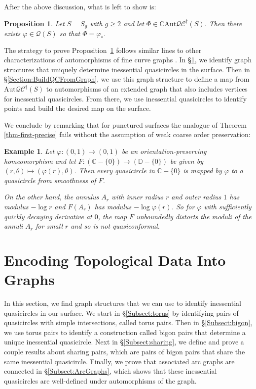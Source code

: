 \documentclass[12pt,a4paper]{amsart}
\newcommand{\bbC}{\mathbb C}
\newcommand{\bbD}{\mathbb D}
\theoremstyle{definition}
\theoremstyle{plain}
\newtheorem{proposition}[theorem]{Proposition}
\newtheorem{example}[theorem]{Example}
\numberwithin{equation}{section}
\newcommand{\qcg}{\mathcal{QC}^{\dagger}}
\newcommand{\Aut}{\mathrm{Aut}}
\begin{document}
After the above discussion, what is left to show is:
\begin{proposition}\label{prop-is-quasiconf}
    Let $S = S_g$ with $g \geq 2$ and let $\Phi \in \mathrm{CAut}\mathcal{QC}^\dagger(S)$. Then there exists $\varphi \in \mathcal{Q}(S)$ so that $\Phi = \varphi_*$.
\end{proposition}

The strategy to prove Proposition~\ref{prop-is-quasiconf} follows similar lines to other characterizations of automorphisms of fine curve graphs \cite{booth2024automorphisms,long2023automorphisms}.
In \S\ref{Section:TopologyToGraphs}, we  identify graph structures that uniquely determine inessential quasicircles in the surface.
Then in \S\ref{Section:BuildQCFromGraph}, we use this graph structure to define a map from $\Aut \qcg (S)$ to automorphisms of an extended graph that also includes vertices for inessential quasicircles.
From there, we use inessential quasicircles to identify points and build the desired map on the surface.

We conclude by remarking that for punctured surfaces the analogue of Theorem \ref{thm-first-precise} fails without the assumption of weak coarse order preservation:

\begin{example}\label{ex-counter-ex}
    Let $\varphi: (0,1) \to (0,1)$ be an orientation-preserving homeomorphism and let $F : (\bbC - \{0\}) \to (\bbD - \{0\})$ be given by $(r,\theta) \mapsto (\varphi(r),\theta)$.
    Then every quasicircle in $\bbC -\{0\}$ is mapped by $\varphi$ to a quasicircle from smoothness of $F$.
    
    On the other hand, the annulus $A_r$ with inner radius $r$ and outer radius $1$ has modulus $-\log r$ and $F(A_r)$ has modulus $-\log \varphi(r)$.
    So for $\varphi$ with sufficiently quickly decaying derivative at $0$, the map $F$ unboundedly distorts the moduli of the annuli $A_r$ for small $r$ and so is not quasiconformal.
\end{example}

\section{Encoding Topological Data Into Graphs}\label{Section:TopologyToGraphs}
In this section, we find graph structures that we can use to identify inessential quasicircles in our surface. We start in \S\ref{Subsect:torus} by identifying pairs of quasicircles with simple intersections, called torus pairs. Then in \S\ref{Subsect:bigon}, we use torus pairs to identify a construction called bigon pairs that determine a unique inessential quasicircle.
Next in \S\ref{Subsect:sharing}, we define and prove a couple results about sharing pairs, which are pairs of bigon pairs that share the same inessential quasicircle.
Finally, we prove that associated arc graphs are connected in \S\ref{Subsect:ArcGraphs}, which shows that these inessential quasicircles are well-defined under automorphisms of the graph.
\end{document}
